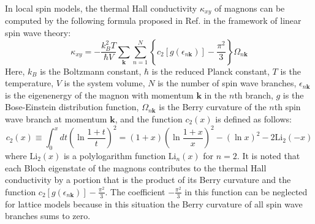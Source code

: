 \documentclass[amsmath,superscriptaddress,showpacs,aps,prl,onecolumn,notitlepage]{revtex4-1}
\begin{document}
\par In local spin models, the thermal Hall conductivity $\kappa_{xy}$ of magnons can be computed by the following formula proposed in Ref. \cite{Matsumoto_PRB2014} in the framework of linear spin wave theory:
\begin{equation}\label{THC}
\kappa_{xy}=-\frac{k_B^2T}{\hbar V}\sum_{\mathbf{k}}\sum_{n=1}^N\left\{c_2\left[g(\epsilon_{n\mathbf{k}})\right]-\frac{\pi^2}{3}\right\}\Omega_{n\mathbf{k}}
\end{equation}
Here, $k_B$ is the Boltzmann constant, $\hbar$ is the reduced Planck constant, $T$ is the temperature, $V$ is the system volume, $N$ is the number of spin wave branches, $\epsilon_{n\mathbf{k}}$ is the eigenenergy of the magnon with momentum $\mathbf{k}$ in the $n$th branch, $g$ is the Bose-Einstein distribution function, $\Omega_{n\mathbf{k}}$ is the Berry curvature of the $n$th spin wave branch at momentum $\mathbf{k}$, and the function $c_2(x)$ is defined as follows:
\begin{equation}\label{C2}
c_2(x)\equiv\int_0^xdt\left(\ln\frac{1+t}{t}\right)^2=(1+x)\left(\ln\frac{1+x}{x}\right)^2-(\ln x)^2-2\text{Li}_2(-x)
\end{equation}
where $\text{Li}_2(x)$ is a polylogarithm function $\text{Li}_n(x)$ for $n=2$. It is noted that each Bloch eigenstate of the magnons contributes to the thermal Hall conductivity by a portion that is the product of its Berry curvature and the function $c_2\left[g(\epsilon_{n\mathbf{k}})\right]-\frac{\pi^2}{3}$. The coefficient $-\frac{\pi^2}{3}$ in this function can be neglected for lattice models because in this situation the Berry curvature of all spin wave branches sums to zero.
\end{document}
